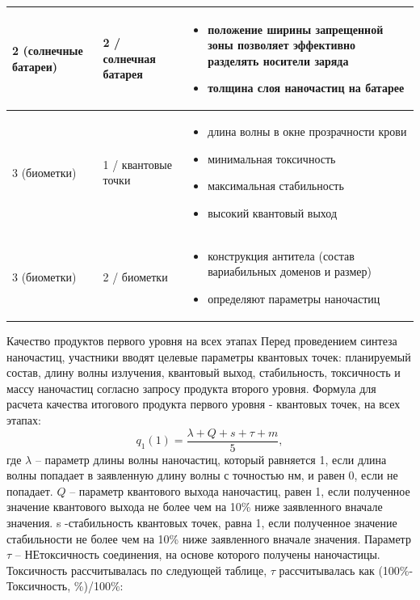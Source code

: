 \begin{table}[H]
\begin{center}
\begin{tabular}{|p{2cm}|p{3cm}|p{8cm}|}
				 \hline
			2 (солнечные батареи)	& 2 / солнечная батарея		& \begin{itemize} \item положение ширины запрещенной зоны позволяет эффективно разделять носители заряда
				\item толщина слоя наночастиц на батарее \end{itemize} \\
				\hline
			3 (биометки)	& 1 / квантовые точки		& \begin{itemize} \item длина волны в окне прозрачности крови
				\item минимальная токсичность
				\item максимальная стабильность
				\item высокий квантовый выход \end{itemize} \\
				\hline
			3 (биометки)	&2 / биометки		& \begin{itemize} \item конструкция антитела (состав вариабильных доменов и размер)
				\item определяют параметры наночастиц \end{itemize} \\
				\hline
		\end{tabular}
	\end{center}
\end{table}

Качество продуктов первого уровня на всех этапах
Перед проведением синтеза наночастиц, участники вводят целевые параметры квантовых точек: планируемый состав, длину волны излучения, квантовый выход, стабильность, токсичность и массу наночастиц согласно запросу продукта второго уровня. Формула для расчета качества итогового продукта первого уровня - квантовых точек, на всех этапах:
$$q_1 (1)=  \frac{\lambda+Q+s+\tau+m}{5},$$
где $\lambda$ – параметр длины волны наночастиц, который равняется 1, если длина волны попадает в заявленную длину волны с точностью  нм, и равен 0, если не попадает. $Q$ – параметр квантового выхода наночастиц, равен 1, если полученное значение квантового выхода не более чем на 10\% ниже заявленного вначале значения. s -стабильность квантовых точек, равна 1, если полученное значение стабильности не более чем на 10\% ниже заявленного вначале значения. Параметр $\tau$ – НЕтоксичность соединения, на основе которого получены наночастицы. Токсичность рассчитывалась по следующей таблице, $\tau$ рассчитывалась как (100\%-Токсичность, \%)/100\%:

